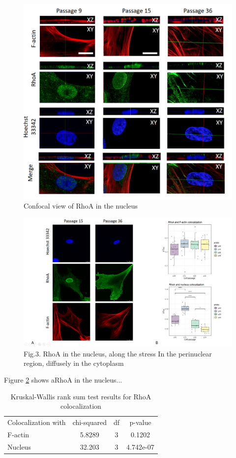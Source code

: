 \documentclass[english,authoryear]{elsarticle}
\begin{document}
\begin{figure}
  \includegraphics[width=0.9\linewidth]{fig4.png}
  \caption{Confocal view of RhoA in the nucleus}
  \label{fig:fig4}
  \centering
\end{figure}


\begin{figure}
  \includegraphics[width=0.8\linewidth]{fig3.png}
  \caption{Fig.3. RhoA in the nucleus, along the stress In the perinuclear region, diffusely in the cytoplasm}
  \label{fig:fig3}
  \centering
\end{figure}

Figure \ref{fig:fig3} shows aRhoA in the nucleus...

\begin{table}
  \caption{Kruskal-Wallis rank sum test results for RhoA colocalization}
  \label{fig:fig4}
\centering
\begin{tabular}{l|ccc}
 Colocalization with & chi-squared & df & p-value  \\
 F-actin & 5.8289 & 3 & 0.1202 \\
 Nucleus & 32.203 & 3 &  4.742e-07

\end{tabular}
\end{table}
\end{document}
